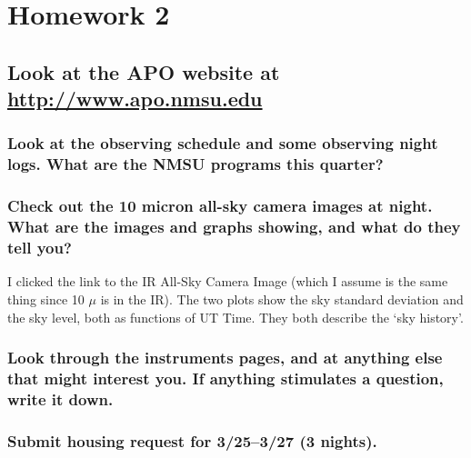 \documentclass[12pt]{article}
\begin{document}
\section*{Homework 2}
\subsection*{Look at the APO website at
\textcolor{blue}{\url{http://www.apo.nmsu.edu}}}

\subsubsection*{Look at the observing schedule and some observing night logs.
    What are the NMSU programs this quarter?}

\subsubsection*{Check out the 10 micron all-sky camera images at night. What are
    the images and graphs showing, and what do they tell you?}

    I clicked the link to the IR All-Sky Camera Image (which I assume is the
    same thing since 10 $\mu$ is in the IR). The two plots show the sky
    standard deviation and the sky level, both as functions of UT Time.
    They both describe the `sky history'.


\subsubsection*{Look through the instruments pages, and at anything else that might
    interest you. If anything stimulates a question, write it down.}

\subsubsection*{Submit housing request for 3/25--3/27 (3 nights).}
\end{document}

